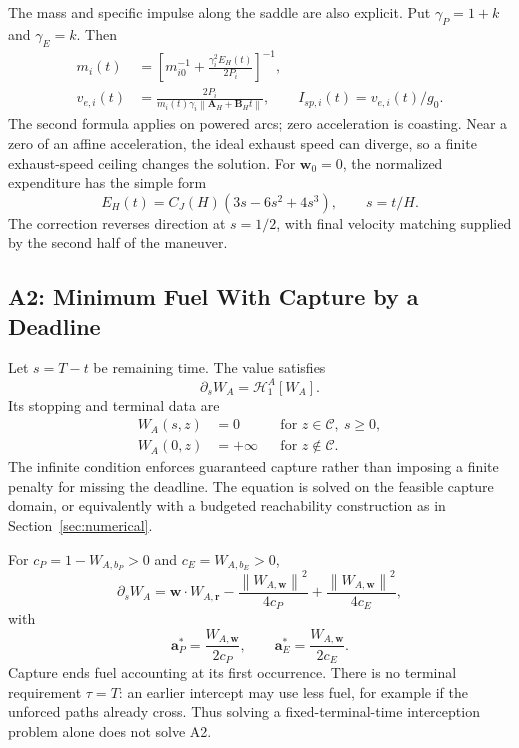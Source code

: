 \documentclass[journal,a4paper]{IEEEtran}
\newcommand{\C}{\mathcal C}
\newcommand{\HH}{\mathcal H}
\newcommand{\norm}[1]{\left\|#1\right\|}
\begin{document}
The mass and specific impulse along the saddle are also explicit. Put $\gamma_P=1+k$ and $\gamma_E=k$. Then
\begin{align}
 m_i(t)&=\left[m_{i0}^{-1}+\frac{\gamma_i^2E_H(t)}{2P_i}\right]^{-1},
 \label{eq:explicitmass}\\
 v_{e,i}(t)&=\frac{2P_i}{m_i(t)\gamma_i
                       \norm{\mathbf A_H+\mathbf B_Ht}},\qquad
 I_{sp,i}(t)=v_{e,i}(t)/g_0.
 \label{eq:explicitexhaust}
\end{align}
The second formula applies on powered arcs; zero acceleration is coasting. Near a zero of an affine acceleration, the ideal exhaust speed can diverge, so a finite exhaust-speed ceiling changes the solution. For $\mathbf w_0=0$, the normalized expenditure has the simple form
\begin{equation}
 E_H(t)=C_J(H)(3s-6s^2+4s^3),\qquad s=t/H.
 \label{eq:Jburnfraction}
\end{equation}
The correction reverses direction at $s=1/2$, with final velocity matching supplied by the second half of the maneuver.

\subsection{A2: Minimum Fuel With Capture by a Deadline}
Let $s=T-t$ be remaining time. The value satisfies
\begin{equation}
 \boxed{\partial_s W_A=\HH^A_1[W_A].}
 \label{eq:A2}
\end{equation}
Its stopping and terminal data are
\begin{align}
 W_A(s,z)&=0&&\text{for }z\in\C,\ s\ge0,\label{eq:Wbc}\\
 W_A(0,z)&=+\infty&&\text{for }z\notin\C.\nonumber
\end{align}
The infinite condition enforces guaranteed capture rather than imposing a finite penalty for missing the deadline. The equation is solved on the feasible capture domain, or equivalently with a budgeted reachability construction as in Section~\ref{sec:numerical}.

For $c_P=1-W_{A,b_P}>0$ and $c_E=W_{A,b_E}>0$,
\begin{equation}
 \partial_s W_A=\mathbf w\cdot W_{A,\mathbf r}
  -\frac{\norm{W_{A,\mathbf w}}^2}{4c_P}
  +\frac{\norm{W_{A,\mathbf w}}^2}{4c_E},
 \label{eq:A2expanded}
\end{equation}
with
\begin{equation}
 \boxed{\mathbf a_P^*=\frac{W_{A,\mathbf w}}{2c_P},\qquad
        \mathbf a_E^*=\frac{W_{A,\mathbf w}}{2c_E}.}
 \label{eq:A2feedback}
\end{equation}
Capture ends fuel accounting at its first occurrence. There is no terminal requirement $\tau=T$: an earlier intercept may use less fuel, for example if the unforced paths already cross. Thus solving a fixed-terminal-time interception problem alone does not solve A2.
\end{document}
